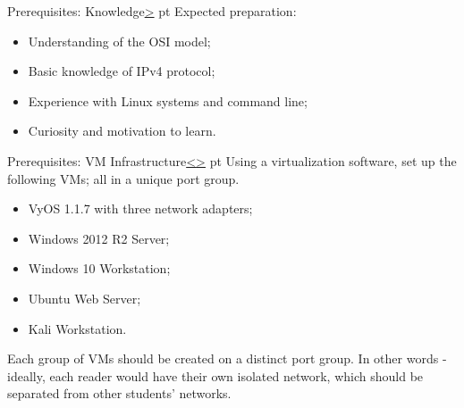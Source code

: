 \documentclass[12pt]{article}
\newenvironment{instructionblock}{\Large\bgroup}{\egroup}
\begin{document}
\pagebreak
{}
\setcounter{section}{1}
\begin{slide}{Prerequisites: Knowledge}{\hyperref[slide 2]{\textgreater}}
	 pt
	\begin{instructionblock}
Expected preparation:
    \begin{itemize}
    \item Understanding of the OSI model;
    \item Basic knowledge of IPv4 protocol;
    \item Experience with Linux systems and command line;
    \item Curiosity and motivation to learn.
    \end{itemize}
	\end{instructionblock}
\end{slide}

\pagebreak
\begin{slide}{Prerequisites: VM Infrastructure}{\hyperref[slide 1]{\textless}\hyperref[slide 3]{\textgreater}}
	 pt
	\begin{instructionblock}
Using a virtualization software, set up the following VMs; all in a unique port group.
    \begin{itemize}
    \item VyOS 1.1.7 with three network adapters;
    \item Windows 2012 R2 Server;
    \item Windows 10 Workstation;
    \item Ubuntu Web Server;
    \item Kali Workstation.
    \end{itemize}
	\end{instructionblock}
\end{slide}

Each group of VMs should be created on a distinct port group. In other words - ideally, each reader would have their own isolated network, which should be separated from other students' networks.


\end{document}
